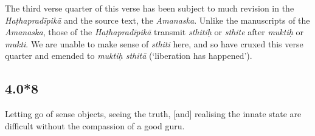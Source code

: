 \begin{ekdosis}
\begin{testimonia}[hp04_000_7]
\end{testimonia}

\begin{philcomm}[hp04_000_7]
The third verse quarter of this verse has been subject to much revision in the \emph{Haṭhapradīpikā} and the source text, the \emph{Amanaska}. Unlike the manuscripts of the \emph{Amanaska}, those of the \emph{Haṭhapradīpikā} transmit \emph{sthitiḥ} or \emph{sthite} after \emph{muktiḥ} or \emph{mukti}. We are unable to make sense of \emph{sthiti} here, and so have cruxed this verse quarter and emended to \emph{muktiḥ sthitā} (`liberation has happened').
\end{philcomm}

\subsection*{4.0*8}
\begin{translation}[hp04_000_8]
Letting go of sense objects, seeing the truth, [and] realising the innate state are difficult without the compassion of a good guru.
\end{translation}


\end{ekdosis}
